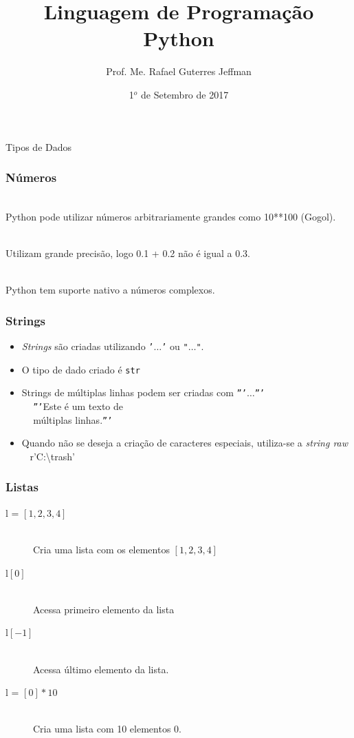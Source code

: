 \documentclass[aspectratio=169,14pt]{beamer}
\title{Linguagem de Programação\\Python}
\author{Prof. Me. Rafael Guterres Jeffman}
\date{1$^o$ de Setembro de 2017}
\begin{document}
\begin{frame}
    \titlepage
\end{frame}

\begin{frame}
    \begin{center}
        \Huge Tipos de Dados
    \end{center}
\end{frame}

\begin{frame}
    \frametitle{Números}
    \begin{description}
        \setlength\itemsep{0.75em}
        \item[int] \hfill \\ Python pode utilizar números
        arbitrariamente grandes como 10**100 (Gogol).
        \item [float] \hfill \\ Utilizam grande precisão, logo 0.1 + 0.2
        não é igual a 0.3.
        \item [complex] \hfill \\ Python tem suporte nativo a números
        complexos.
    \end{description}
\end{frame}

\begin{frame}
    \frametitle{Strings}
    \begin{itemize}[label={}]
        \item \textit{Strings} são criadas utilizando \texttt{'$\ldots$'}
        ou \texttt{"$\ldots$"}.
        \item O tipo de dado criado é {\color{green}\texttt{str}}
        \item Strings de múltiplas linhas podem ser criadas com
        \texttt{'''$\ldots$'''} \\
            $\;\;\;$ \texttt{'''}Este é um texto de \\
            $\;\;\;$ múltiplas linhas.\texttt{'''}
        \item Quando não se deseja a criação de caracteres especiais,
        utiliza-se a \textit{string raw} \\
            $\;\;\;$r'C:\textbackslash trash'
    \end{itemize}
\end{frame}

\begin{frame}
    \frametitle{Listas}
    \begin{description}
        \item[l = {$[1,2,3,4]$}] \hfill \\ Cria uma lista com os elementos $[1,2,3,4]$
        \item[l{$[0]$}] \hfill \\ Acessa primeiro elemento da lista
        \item[l{$[-1]$}] \hfill \\ Acessa último elemento da lista.
        \item[l = {$[0]*10$}] \hfill \\ Cria uma lista com 10 elementos $0$.
    \end{description}
\end{frame}
\end{document}
